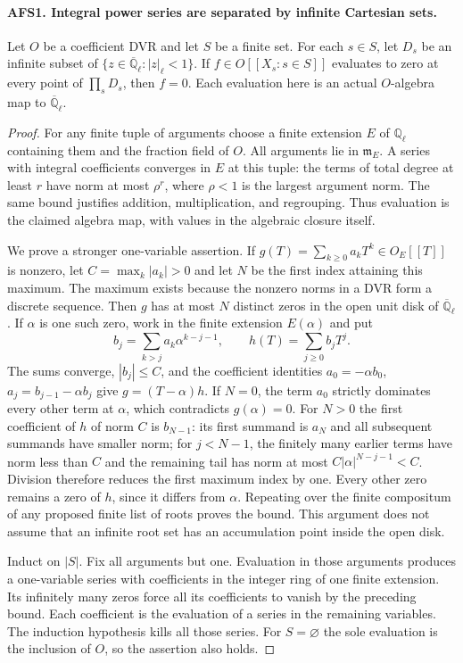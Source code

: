 \paragraph{AFS1. Integral power series are separated by infinite Cartesian sets.}
\label{claim:AFS1}
Let $O$ be a coefficient DVR and let $S$ be a finite set.  For each
$s\in S$, let $D_s$ be an infinite subset of
$\{z\in\overline{\mathbb Q}_\ell:|z|_\ell<1\}$.  If
$f\in O[[X_s:s\in S]]$ evaluates to zero at every point of
$\prod_sD_s$, then $f=0$.  Each evaluation here is an actual
$O$-algebra map to $\overline{\mathbb Q}_\ell$.
\begin{proof}
For any finite tuple of arguments choose a finite extension $E$ of
$\mathbb Q_\ell$ containing them and the fraction field of $O$.
All arguments lie in $\mathfrak m_E$.  A series with integral
coefficients converges in $E$ at this tuple: the terms of total
degree at least $r$ have norm at most $\rho^r$, where
$\rho<1$ is the largest argument norm.  The same bound justifies
addition, multiplication, and regrouping.  Thus evaluation is the
claimed algebra map, with values in the algebraic closure itself.

We prove a stronger one-variable assertion.  If
$g(T)=\sum_{k\geq0}a_kT^k\in O_E[[T]]$ is nonzero, let
$C=\max_k|a_k|>0$ and let $N$ be the first index attaining this
maximum.  The maximum exists because the nonzero norms in a DVR
form a discrete sequence.  Then $g$ has at most $N$ distinct zeros
in the open unit disk of $\overline{\mathbb Q}_\ell$.
If $\alpha$ is one such zero, work in the finite extension
$E(\alpha)$ and put
\[
 b_j=\sum_{k>j}a_k\alpha^{k-j-1},\qquad
 h(T)=\sum_{j\geq0}b_jT^j.
\]
The sums converge, $|b_j|\leq C$, and the coefficient identities
$a_0=-\alpha b_0$, $a_j=b_{j-1}-\alpha b_j$ give
$g=(T-\alpha)h$.  If $N=0$, the term $a_0$ strictly dominates
every other term at $\alpha$, which contradicts $g(\alpha)=0$.
For $N>0$ the first coefficient of $h$ of norm $C$ is
$b_{N-1}$: its first summand is $a_N$ and all subsequent summands
have smaller norm; for $j<N-1$, the finitely many earlier terms
have norm less than $C$ and the remaining tail has norm at most
$C|\alpha|^{N-j-1}<C$.  Division therefore reduces the first
maximum index by one.  Every other zero remains a zero of $h$,
since it differs from $\alpha$.  Repeating over the finite
compositum of any proposed finite list of roots proves the bound.
This argument does not assume that an infinite root set has an
accumulation point inside the open disk.

Induct on $|S|$.  Fix all arguments but one.  Evaluation in those
arguments produces a one-variable series with coefficients in the
integer ring of one finite extension.  Its infinitely many zeros
force all its coefficients to vanish by the preceding bound.
Each coefficient is the evaluation of a series in the remaining
variables.  The induction hypothesis kills all those series.
For $S=\varnothing$ the sole evaluation is the inclusion of $O$,
so the assertion also holds.
\end{proof}

